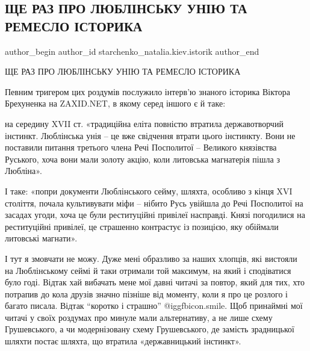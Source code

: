  
 
 
 
 
 
\subsection{ЩЕ РАЗ ПРО ЛЮБЛІНСЬКУ УНІЮ ТА РЕМЕСЛО ІСТОРИКА}
\label{sec:11_09_2020.fb.starchenko_natalia.kiev.istorik.1.ljublin_unia_remeslo_istorik}
 
\ifcmt
 author_begin
   author_id starchenko_natalia.kiev.istorik
 author_end
\fi

ЩЕ РАЗ ПРО ЛЮБЛІНСЬКУ УНІЮ ТА РЕМЕСЛО ІСТОРИКА

Певним тригером цих роздумів послужило інтерв’ю знаного історика Віктора
Брехуненка на ZAXID.NET, в якому серед іншого є й таке:  

на середину XVII ст. «традиційна еліта повністю втратила державотворчий
інстинкт. Люблінська унія – це вже свідчення втрати цього інстинкту. Вони не
поставили питання третього члена Речі Посполитої – Великого князівства
Руського, хоча вони мали золоту акцію, коли литовська магнатерія пішла з
Любліна». 

І таке: «попри документи Люблінського сейму, шляхта, особливо з кінця XVI
століття, почала культивувати міфи – нібито Русь увійшла до Речі Посполитої на
засадах угоди, хоча це були реституційні привілеї насправді. Князі погодилися
на реституційні привілеї, це страшенно контрастує із позицією, яку обіймали
литовські магнати». 

І тут я змовчати не можу. Дуже мені образливо за наших хлопців, які вистояли на
Люблінському сеймі й таки отримали той максимум, на який і сподіватися було
годі. Відтак хай вибачать мене мої давні читачі за повтор, який для тих, хто
потрапив до кола друзів значно пізніше від моменту, коли я про це розлого і
багато писала. Відтак \enquote{коротко і страшно}  @igg{fbicon.smile}. Щоб
принаймні мої читачі у своїх роздумах про минуле мали альтернативу, а не лише
схему Грушевського, а чи модернізовану схему Грушевського, де замість
зрадницької шляхти постає шляхта, що втратила «державницький інстинкт».  

